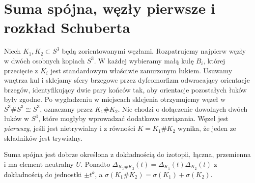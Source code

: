 \section{Suma spójna, węzły pierwsze i rozkład Schuberta}
\label{sec:kt-suma}

\begin{definicja}
Niech $K_1,K_2\subset S^3$ będą zorientowanymi węzłami.
Rozpatrujemy najpierw węzły w dwóch osobnych kopiach
$S^3$. W każdej wybieramy małą kulę $B_i$, której przecięcie
z $K_i$ jest standardowym właściwie zanurzonym łukiem.
Usuwamy wnętrza kul i sklejamy sfery brzegowe przez
dyfeomorfizm odwracający orientacje brzegów, identyfikujący
dwie pary końców tak, aby orientacje pozostałych łuków
były zgodne. Po wygładzeniu w miejscach sklejenia otrzymujemy
węzeł w $S^3\#S^3\cong S^3$, oznaczany przez $K_1\#K_2$.
Nie chodzi o dołączenie dowolnych dwóch łuków w $S^3$,
które mogłyby wprowadzać dodatkowe zawiązania.
Węzeł jest \emph{pierwszy}, jeśli jest nietrywialny i z równości
$K=K_1\#K_2$ wynika, że jeden ze składników jest trywialny.
\end{definicja}

\begin{stwierdzenie}
Suma spójna jest dobrze określona z dokładnością do izotopii,
łączna, przemienna i ma element neutralny $U$.
Ponadto $\Delta_{K_1\#K_2}(t)=\Delta_{K_1}(t)\Delta_{K_2}(t)$
z dokładnością do jednostki $\pm t^k$, a
$\sigma(K_1\#K_2)=\sigma(K_1)+\sigma(K_2)$.
\end{stwierdzenie}

